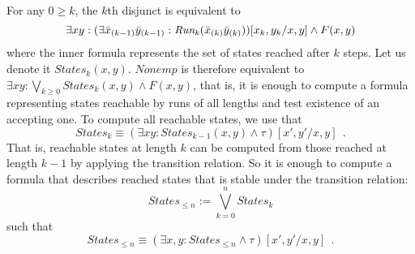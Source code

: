 \documentclass[10pt]{llncs}
\newcommand{\subst}[3]{#1[#2/#3]}
\newcommand{\Nonempty}{\mathit{Nonemp}}
\newcommand{\Run}[1]{\mathit{Run_{#1}}}
\newcommand{\Prefix}[1]{\mathit{Pref_{#1}}}
\newcommand{\Suffix}[1]{\mathit{Suff_{#1}}}
\newcommand{\States}[1]{\mathit{States_{#1}}}
\newcommand{\initial}{I}
\newcommand{\final}{F}
\newcommand{\transition}{\tau}
\newcommand{\fdef}{\mathrel{:=}}
\begin{document}
For any $0\geq k$, the $k$th disjunct is equivalent to 
$$
\exists xy: \subst{(\exists \vect x[k-1]\vect y[k-1]:\Run {k}(\vect x[k]\vect y[k]))}{x_k,y_k}{x,y}
\land 
\final(x,y)
$$
where the inner formula represents the set of states reached after $k$ steps.
Let us denote it $\States k(x,y)$. $\Nonempty$ is therefore equivalent to
$\exists xy:\bigvee_{k\geq 0} \States k(x,y) \land \final(x,y)$, that is, it is enough to compute a formula representing states reachable by runs of all lengths and test existence of an accepting one.
%
To compute all reachable states, we use that 
$$
\States k \equiv \subst{(\exists xy:\States {k-1}(x,y)
\land 
\transition)}{x',y'}{x,y}
\ \ .
$$
That is, reachable states at length $k$ can be computed from those reached at length $k-1$ by applying the transition relation.  
%
So it is enough to compute a formula that describes reached states that is stable under the transition relation:
$$\States {\leq n} \fdef \bigvee_{k=0}^n \States k$$ 
such that 
$$\States {\leq n}  \equiv \subst{(\exists x,y: \States {\leq n}\land \transition)}{x',y'}{x,y}\ \ .$$


\end{document}
